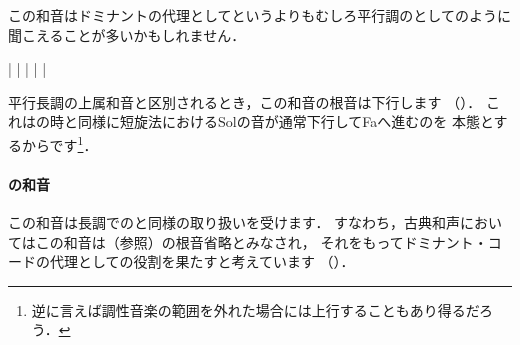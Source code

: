 \documentclass[dvipdfmx,uplatex,b5paper,openany,jbase=12Q,nomag*,textwidth-limit=44%
               ]{gachimuchi}
\begin{document}
この和音はドミナントの代理としてというよりもむしろ平行調のとしてのように
聞こえることが多いかもしれません．

\begin{floatMusic}[pos=ht]
  \Startpiece%
  \NOTes
  |%
  \en\bar
  \NOTes
  |%
  \en\bar
  \NOTes
  |%
  \en\setdoublebar
  \endpiece%
\end{floatMusic}

平行長調の上属和音と区別されるとき，この和音の根音は下行します
（）．
これは\Gnv\Min の時と同様に短旋法におけるSol\aNatural の音が通常下行してFa\aNatural へ進むのを
本態とするからです\footnote{
  逆に言えば調性音楽の範囲を外れた場合には上行することもあり得るだろう．
}．

\paragraph{\Gnvii\Dimt の和音}
この和音は長調での\Gnvii\Dimt と同様の取り扱いを受けます．
すなわち，古典和声においてはこの和音は\Gnv{}（参照）の根音省略とみなされ，
それをもってドミナント・コードの代理としての役割を果たすと考えています
（）．
\end{document}
